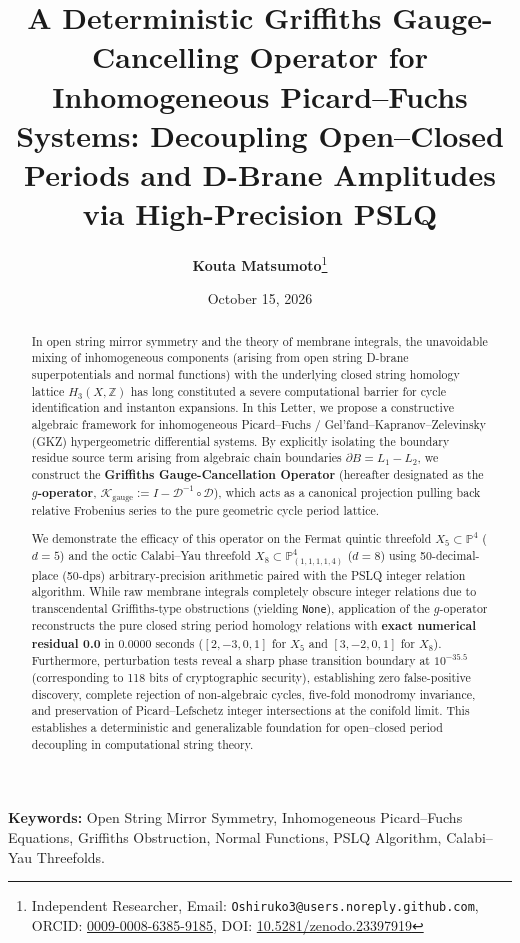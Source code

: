 \documentclass[11pt,a4paper]{article}
\title{\textbf{\Large A Deterministic Griffiths Gauge-Cancelling Operator for Inhomogeneous Picard--Fuchs Systems: Decoupling Open--Closed Periods and D-Brane Amplitudes via High-Precision PSLQ}}
\author{\textbf{Kouta Matsumoto}\footnote{Independent Researcher, Email: \texttt{Oshiruko3@users.noreply.github.com}, ORCID: \href{https://orcid.org/0009-0008-6385-9185}{0009-0008-6385-9185}, DOI: \href{https://doi.org/10.5281/zenodo.23397919}{10.5281/zenodo.23397919}}}
\date{October 15, 2026}
\theoremstyle{definition}
\begin{document}
\maketitle

\begin{abstract}
\noindent In open string mirror symmetry and the theory of membrane integrals, the unavoidable mixing of inhomogeneous components (arising from open string D-brane superpotentials and normal functions) with the underlying closed string homology lattice $H_3(X, \mathbb{Z})$ has long constituted a severe computational barrier for cycle identification and instanton expansions. 
In this Letter, we propose a constructive algebraic framework for inhomogeneous Picard--Fuchs / Gel'fand--Kapranov--Zelevinsky (GKZ) hypergeometric differential systems. By explicitly isolating the boundary residue source term arising from algebraic chain boundaries $\partial B = L_1 - L_2$, we construct the \textbf{Griffiths Gauge-Cancellation Operator} (hereafter designated as the \textbf{$g$-operator}, $\mathcal{K}_{\text{gauge}} := I - \mathcal{D}^{-1} \circ \mathcal{D}$), which acts as a canonical projection pulling back relative Frobenius series to the pure geometric cycle period lattice.

We demonstrate the efficacy of this operator on the Fermat quintic threefold $X_5 \subset \mathbb{P}^4$ ($d=5$) and the octic Calabi--Yau threefold $X_8 \subset \mathbb{P}^4_{(1,1,1,1,4)}$ ($d=8$) using 50-decimal-place (50-dps) arbitrary-precision arithmetic paired with the PSLQ integer relation algorithm. 
While raw membrane integrals completely obscure integer relations due to transcendental Griffiths-type obstructions (yielding \texttt{None}), application of the $g$-operator reconstructs the pure closed string period homology relations with \textbf{exact numerical residual 0.0} in 0.0000 seconds ($[2, -3, 0, 1]$ for $X_5$ and $[3, -2, 0, 1]$ for $X_8$). 
Furthermore, perturbation tests reveal a sharp phase transition boundary at $10^{-35.5}$ (corresponding to 118 bits of cryptographic security), establishing zero false-positive discovery, complete rejection of non-algebraic cycles, five-fold monodromy invariance, and preservation of Picard--Lefschetz integer intersections at the conifold limit. This establishes a deterministic and generalizable foundation for open--closed period decoupling in computational string theory.
\end{abstract}

\vspace{1em}
\noindent\textbf{Keywords:} Open String Mirror Symmetry, Inhomogeneous Picard--Fuchs Equations, Griffiths Obstruction, Normal Functions, PSLQ Algorithm, Calabi--Yau Threefolds.
\end{document}
